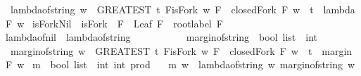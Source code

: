 \begin{isabellebody}
\ \ {\isachardoublequoteopen}lambda{\isacharunderscore}of{\isacharunderscore}string\ w\ {\isacharequal}\ {\isacharparenleft}GREATEST\ t{\isachardot}\ {\isacharparenleft}{\isasymexists}F{\isachardot}{\isacharparenleft}isFork\ w\ F\ {\isasymand}\ closedFork\ F\ w\ {\isasymand}\ t\ {\isacharequal}\ lambda\ F\ w{\isacharparenright}{\isacharparenright}{\isacharparenright}{\isachardoublequoteclose}\isanewline
\isanewline
{}\isamarkupfalse%
\ isFork{\isacharunderscore}Nil\ {\isacharcolon}\ {\isachardoublequoteopen}isFork\ {\isacharbrackleft}{\isacharbrackright}\ F\ {\isasymlongrightarrow}\ Leaf\ F\ {\isasymand}\ root{\isacharunderscore}label{\isacharunderscore}{}\ F{\isachardoublequoteclose}\isanewline
%
\isadelimproof
\ \ %
\endisadelimproof
%
\isatagproof
{}\isamarkupfalse%
%
\endisatagproof
{\isafoldproof}%
%
\isadelimproof
\isanewline
%
\endisadelimproof
\ \ \ \ \isanewline
{}\isamarkupfalse%
\ lambda{\isacharunderscore}of{\isacharunderscore}nil\ {\isacharcolon}\ {\isachardoublequoteopen}lambda{\isacharunderscore}of{\isacharunderscore}string\ {\isacharbrackleft}{\isacharbrackright}\ {\isacharequal}\ {}{\isachardoublequoteclose}\ \ \isanewline
%
\isadelimproof
%
\endisadelimproof
%
\isatagproof
{}\isamarkupfalse%
%
\endisatagproof
{\isafoldproof}%
%
\isadelimproof
\isanewline
%
\endisadelimproof
\isanewline
\ \ \ \ \isanewline
{}\isamarkupfalse%
\ margin{\isacharunderscore}of{\isacharunderscore}string\ {\isacharcolon}{\isacharcolon}\ {\isachardoublequoteopen}bool\ list\ {\isasymRightarrow}\ int{\isachardoublequoteclose}\ \isanewline
\ \ {\isachardoublequoteopen}margin{\isacharunderscore}of{\isacharunderscore}string\ w\ {\isacharequal}\ {\isacharparenleft}GREATEST\ t{\isachardot}\ {\isacharparenleft}{\isasymexists}F{\isachardot}{\isacharparenleft}isFork\ w\ F\ {\isasymand}\ closedFork\ F\ w\ {\isasymand}\ t\ {\isacharequal}\ margin\ F\ w{\isacharparenright}{\isacharparenright}{\isacharparenright}{\isachardoublequoteclose}\isanewline
\isanewline
{}\isamarkupfalse%
\ m\ {\isacharcolon}{\isacharcolon}\ {\isachardoublequoteopen}bool\ list\ {\isasymRightarrow}\ {\isacharparenleft}int{\isacharcomma}\ int{\isacharparenright}\ prod{\isachardoublequoteclose}\ \isanewline
\ \ {\isachardoublequoteopen}m\ w\ {\isacharequal}\ {\isacharparenleft}lambda{\isacharunderscore}of{\isacharunderscore}string\ w{\isacharcomma}\ margin{\isacharunderscore}of{\isacharunderscore}string\ w{\isacharparenright}{\isachardoublequoteclose}\isanewline

\end{isabellebody}
